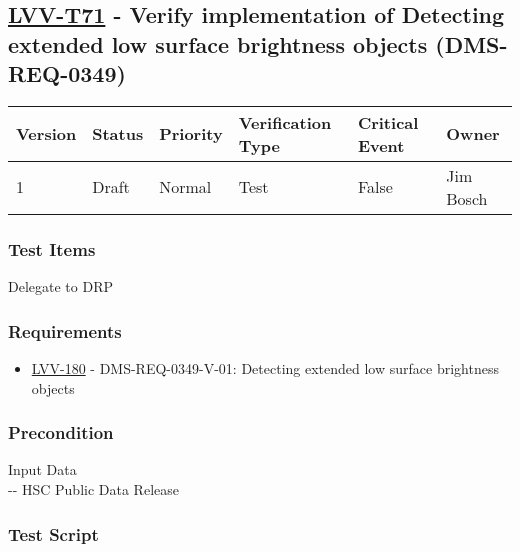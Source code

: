 \hypertarget{lvv-t71---verify-implementation-of-detecting-extended-low-surface-brightness-objects-dms-req-0349}{%
\subsection{\texorpdfstring{\href{https://jira.lsstcorp.org/secure/Tests.jspa\#/testCase/LVV-T71}{LVV-T71}
- Verify implementation of Detecting extended low surface brightness
objects
(DMS-REQ-0349)}{LVV-T71 - Verify implementation of Detecting extended low surface brightness objects (DMS-REQ-0349)}}\label{lvv-t71---verify-implementation-of-detecting-extended-low-surface-brightness-objects-dms-req-0349}}

\begin{longtable}[]{@{}llllll@{}}
\toprule
Version & Status & Priority & Verification Type & Critical Event &
Owner\tabularnewline
\midrule
\endhead
1 & Draft & Normal & Test & False & Jim Bosch\tabularnewline
\bottomrule
\end{longtable}

\hypertarget{test-items-160}{%
\subsubsection{Test Items}\label{test-items-160}}

Delegate to DRP

\hypertarget{requirements-161}{%
\subsubsection{Requirements}\label{requirements-161}}

\begin{itemize}
\tightlist
\item
  \href{https://jira.lsstcorp.org/browse/LVV-180}{LVV-180} -
  DMS-REQ-0349-V-01: Detecting extended low surface brightness objects
\end{itemize}

\hypertarget{precondition-5}{%
\subsubsection{Precondition}\label{precondition-5}}

Input Data\\
\hspace*{0.333em}-\/- HSC Public Data Release

\hypertarget{test-script-161}{%
\subsubsection{Test Script}\label{test-script-161}}

